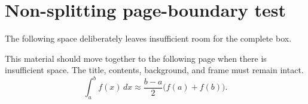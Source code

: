 \documentclass{otscience}
\begin{document}
\clearpage
\section{Non-splitting page-boundary test}

The following space deliberately leaves insufficient room for the
complete box.

\rule{0pt}{0.72\textheight}

\begin{formulaboxnosplit}
    This material should move together to the following page when there
    is insufficient space. The title, contents, background, and frame
    must remain intact.
    \[
        \int_a^b f(x)\,dx
        \approx
        \frac{b-a}{2}\bigl(f(a)+f(b)\bigr).
    \]
\end{formulaboxnosplit}
\end{document}
